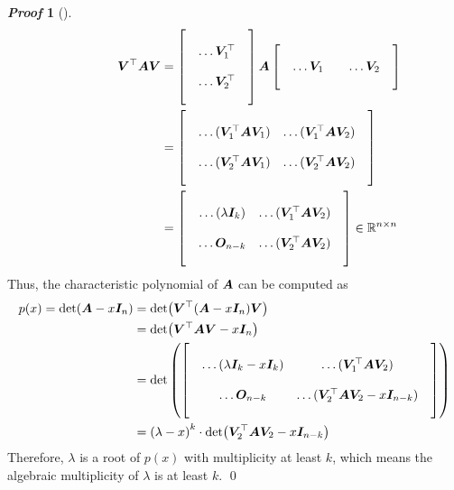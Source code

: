 \documentclass[10pt,UTF8]{article}
\newcommand{\mat}[1]{\matrixsym{#1}}
\theoremstyle{definition}
\newtheorem{definition inner}{Definition}[section]
\theoremstyle{definition}
\newtheorem{theorem inner}{Theorem}[section]
\theoremstyle{definition}
\newtheorem*{proof inner}{\textit{Proof}}
\renewenvironment{proof}[1][]
{
\begin{proof inner}[#1]\hfill\par}
  {\qed\vphantom{.}
\end{proof inner}}
\theoremstyle{plain}
\newtheorem{tip inner}{Tip}[section]
\theoremstyle{remark}
\begin{document}
\begin{proof}
\begin{align*}
    \qquad\qquad
    \mat{V}^\top \mat{A} \mat{V} &=
    \begin{bmatrix}
      & & \\
      & \ldots \mat{V}_1^\top & \\
      & & \\
      & \ldots \mat{V}_2^\top & \\
      & &
    \end{bmatrix} \mat{A}
    \begin{bmatrix}
      & & & & \\
      & \ldots \mat{V}_1 & & \ldots \mat{V}_2 & \\
      & & & &
    \end{bmatrix} \\
    &=
    \begin{bmatrix}
      & & \\
      & \ldots (\mat{V}_1^\top \mat{A} \mat{V}_1) & \ldots (\mat{V}_1^\top \mat{A} \mat{V}_2) & \\
      & & \\
      & \ldots (\mat{V}_2^\top \mat{A} \mat{V}_1) & \ldots (\mat{V}_2^\top \mat{A} \mat{V}_2) & \\
      & &
    \end{bmatrix} \\
    &=
    \begin{bmatrix}
      & & \\
      & \ldots (\lambda \mat{I}_k) & \ldots (\mat{V}_1^\top \mat{A} \mat{V}_2) & \\
      & & \\
      & \ldots \mat{O}_{n-k} & \ldots (\mat{V}_2^\top \mat{A} \mat{V}_2) & \\
      & &
    \end{bmatrix}
    \in \mathbb{R}^{n \times n}
  \end{align*}
  Thus, the characteristic polynomial of \(\mat{A}\) can be computed as
  \begin{align*}
    p(x) =
    \det(\mat{A} - x \mat{I}_n)
    &= \det(\mat{V}^\top (\mat{A} - x \mat{I}_n) \mat{V} ) \\
    &= \det(\mat{V}^\top \mat{A} \mat{V} - x \mat{I}_n) \\
    &= \det\left(
      \begin{bmatrix}
        & & \\
        & \ldots (\lambda \mat{I}_k - x \mat{I}_k) & \ldots (\mat{V}_1^\top \mat{A} \mat{V}_2) & \\
        & & \\
        & \ldots \mat{O}_{n-k} & \ldots (\mat{V}_2^\top \mat{A} \mat{V}_2 - x \mat{I}_{n-k}) & \\
        & &
      \end{bmatrix}
    \right) \\
    &= {(\lambda - x)}^k
    \cdot
    \det(\mat{V}_2^\top \mat{A} \mat{V}_2 - x \mat{I}_{n-k})
  \end{align*}
  Therefore, \(\lambda \) is a root of \(p(x)\) with multiplicity at
  least \(k\),
  which means the algebraic multiplicity of \(\lambda \) is at least \(k\).
\end{proof}
\end{document}
